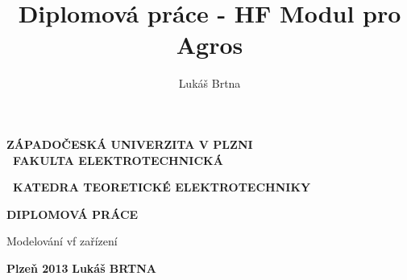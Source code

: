 \documentclass[12pt,a4paper,oneside]{article}
\author{Lukáš Brtna}
\title{Diplomová práce - HF Modul pro Agros}
\numberwithin{equation}{section} %
\numberwithin{figure}{section} %
\numberwithin{table}{section} %
\newcommand{\tg}{\mathrm{tg}\ }
\newcommand{\grad}{\mathrm{grad}\ }
\newcommand{\rot}{\mathrm{rot}\ }
\renewcommand{\div}{\mathrm{div}\ }
\begin{document}
\renewcommand\refname{Použitá literatura} %
\newcommand{\cotg}{\mathop{\rm cotg}\nolimits} %
\newcommand{\udiv}{\mathop{\rm div}\nolimits} %
\newcommand{\ud}{\mathrm{d}} %



\pagestyle{empty} %


\begin{titlepage} 
\begin{center}

\begin{large}
\textbf{ZÁPADOČESKÁ UNIVERZITA V PLZNI\\
~FAKULTA ELEKTROTECHNICKÁ\\
\vspace*{5mm}}
\end{large}
\textbf{~KATEDRA TEORETICKÉ ELEKTROTECHNIKY}
\vspace{70mm}\\

\begin{Huge}
\textbf{DIPLOMOVÁ PRÁCE}
\vspace{8mm}\\
\end{Huge}
\begin{LARGE}
Modelování vf zařízení \vspace{90mm}\\
\end{LARGE}
\end{center}

\begin{flushleft}
\begin{large}
\textbf{Plzeň 2013}
\hfill
\textbf{Lukáš BRTNA}
\end{large}
\end{flushleft}
\end{titlepage}
\newpage
\end{document}

